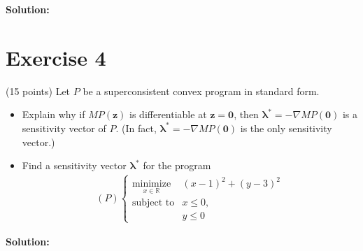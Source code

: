 \documentclass{article}
\begin{document}
\textbf{Solution:} \\



\newpage

\section*{Exercise 4}
(15 points) Let $P$ be a superconsistent convex program in standard form.
\begin{itemize}
\item Explain why if $MP(\mathbf{z})$ is differentiable at $\mathbf{z} = \mathbf{0}$, then $\boldsymbol{\lambda}^* = -\nabla MP(\mathbf{0})$ is a sensitivity vector of $P$. (In fact, $\boldsymbol{\lambda}^* = -\nabla MP(\mathbf{0})$ is the only sensitivity vector.)
\item Find a sensitivity vector $\boldsymbol{\lambda}^*$ for the program
\begin{align*}
(P) \begin{cases}
\underset{x\in\mathbb{R}}{\text{minimize}} & (x - 1)^2 + (y - 3)^2 \\
\text{subject to} & x \leq 0, \\
& y \leq 0
\end{cases}
\end{align*}
\end{itemize}

\textbf{Solution:} \\
\end{document}
